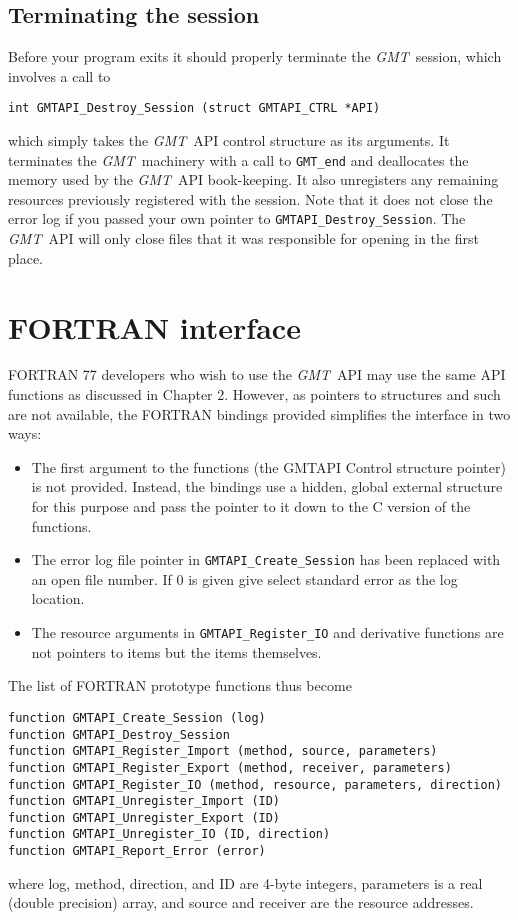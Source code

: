 \documentclass{report}
\newcommand{\GMT}{\textit{GMT}}%
\newcommand{\GMT}{\htmladdnormallink{\texttt{[image: eps/GMT\_glyph10.eps]}}{http://gmt.soest.hawaii.edu}}%
\newcommand{\GMT}{\htmladdnormallink{\textbf{GMT}}{http://gmt.soest.hawaii.edu}}%
\begin{document}
\section{Terminating the session}
\index{GMT@\GMT!Terminating the session}

Before your program exits it should properly terminate the \GMT\ session, which involves a call to

\begin{verbatim}
int GMTAPI_Destroy_Session (struct GMTAPI_CTRL *API)
\end{verbatim}
which simply takes the \GMT\ API control structure as its arguments.  It terminates the \GMT\ machinery
with a call to \texttt{GMT\_end} and deallocates the memory used by the \GMT\ API book-keeping. It
also unregisters any remaining resources previously registered with the session.
Note that it does not close the error log if you passed your own pointer to \texttt{GMTAPI\_Destroy\_Session}.
The \GMT\ API will only close files that it was responsible for opening in the first place.

\chapter{FORTRAN interface} 

FORTRAN 77 developers who wish to use the \GMT\ API may use the same API functions as discussed in Chapter 2.
However, as pointers to structures and such are not available, the FORTRAN bindings provided simplifies the
interface in two ways:
\begin{itemize}
\item The first argument to the functions (the GMTAPI Control structure pointer) is not provided.  Instead,
the bindings use a hidden, global external structure for this purpose and pass the pointer to it down to
the C version of the functions.
\item The error log file pointer in \texttt{GMTAPI\_Create\_Session} has been replaced with an open file
number.  If 0 is given give select standard error as the log location.
\item The resource arguments in \texttt{GMTAPI\_Register\_IO} and derivative functions are not pointers to
items but the items themselves.
\end{itemize}
The list of FORTRAN prototype functions thus become
\begin{verbatim}
function GMTAPI_Create_Session (log)
function GMTAPI_Destroy_Session
function GMTAPI_Register_Import (method, source, parameters)
function GMTAPI_Register_Export (method, receiver, parameters)
function GMTAPI_Register_IO (method, resource, parameters, direction)
function GMTAPI_Unregister_Import (ID)
function GMTAPI_Unregister_Export (ID)
function GMTAPI_Unregister_IO (ID, direction)
function GMTAPI_Report_Error (error)
\end{verbatim}
where log, method, direction, and ID are 4-byte integers, parameters is a real (double precision) array,
and source and receiver are the resource addresses.
\end{document}
